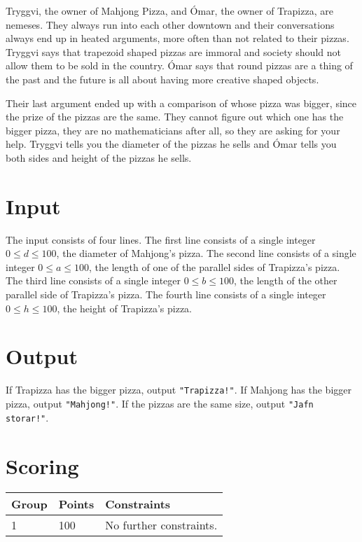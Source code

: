 
Tryggvi, the owner of Mahjong Pizza, and Ómar, the owner of Trapizza, are nemeses.
They always run into each other downtown and their conversations always end up in heated arguments, more often than not related to their pizzas.
Tryggvi says that trapezoid shaped pizzas are immoral and society should not allow them to be sold in the country.
Ómar says that round pizzas are a thing of the past and the future is all about having more creative shaped objects.

Their last argument ended up with a comparison of whose pizza was bigger, since the prize of the pizzas are the same.
They cannot figure out which one has the bigger pizza, they are no mathematicians after all, so they are asking for your help.
Tryggvi tells you the diameter of the pizzas he sells and Ómar tells you both sides and height of the pizzas he sells.

\section*{Input}
The input consists of four lines. The first line consists of a single integer $0 \leq d \leq 100$, the diameter of Mahjong's pizza.
The second line consists of a single integer $0 \leq a \leq 100$, the length of one of the parallel sides of Trapizza's pizza.
The third line consists of a single integer $0 \leq b \leq 100$, the length of the other parallel side of Trapizza's pizza.
The fourth line consists of a single integer $0 \leq h \leq 100$, the height of Trapizza's pizza.

\section*{Output}
If Trapizza has the bigger pizza, output \texttt{"Trapizza!"}. 
If Mahjong has the bigger pizza, output \texttt{"Mahjong!"}.
If the pizzas are the same size, output \texttt{"Jafn storar!"}.

\section*{Scoring}
\begin{tabular}{|l|l|l|}
\hline
Group & Points & Constraints \\ \hline
1     & 100   & No further constraints. \\ \hline
\end{tabular}
